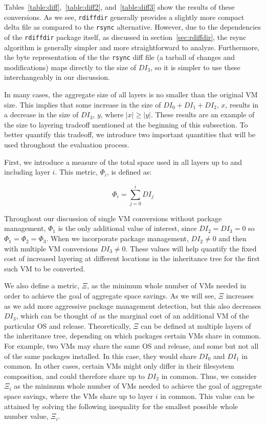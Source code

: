 Tables~\ref{table:diff},~\ref{table:diff2}, and~\ref{table:diff3} show the results of these conversions. As we see, \texttt{rdiffdir} generally provides a slightly more compact delta file as compared to the \texttt{rsync} alternative. However, due to the dependencies of the \texttt{rdiffdir} package itself, as discussed in section~\ref{sec:rdiffdir}, the rsync algorithm is generally simpler and more straightforward to analyze. Furthermore, the byte representation of the the \texttt{rsync} diff file (a tarball of changes and modifications) maps directly to the size of $DI_3$, so it is simpler to use these interchangeably in our discussion.

In many cases, the aggregate size of all layers is no smaller than the original VM size. This implies that some increase in the size of $DI_0+DI_1 + DI_2$, $x$, results in a decrease in the size of $DI_3$, $y$, where $|x| \ge |y|$. These results are an example of the size to layering tradeoff mentioned at the beginning of this subsection. To better quantify this tradeoff, we introduce two important quantities that will be used throughout the evaluation process. 

First, we introduce a measure of the total space used in all layers up to and including layer $i$. This metric, $\Phi_i$, is defined as:

\begin{equation}
\Phi_i = \sum_{j=0}^i DI_j
\end{equation}

Throughout our discussion of single VM conversions without package management, $\Phi_1$ is the only additional value of interest, since $DI_2=DI_3=0$ so $\Phi_1=\Phi_2=\Phi_3$. When we incorporate package management, $DI_2 \neq 0$ and then with multiple VM conversions $DI_3 \neq 0$. These values will help quantify the fixed cost of increased layering at different locations in the inheritance tree for the first such VM to be converted. 

We also define a metric, $\Xi$, as the minimum whole number of VMs needed in order to achieve the goal of aggregate space savings. As we will see, $\Xi$ increases as we add more aggressive package management detection, but this also decreases $DI_3$, which can be thought of as the marginal cost of an additional VM of the particular OS and release. Theoretically, $\Xi$ can be defined at multiple layers of the inheritance tree, depending on which packages certain VMs share in common. For example, two VMs may share the same OS and release, and some but not all of the same packages installed. In this case, they would share $DI_0$ and $DI_1$ in common. In other cases, certain VMs might only differ in their filesystem composition, and could therefore share up to $DI_2$ in common. Thus, we consider $\Xi_i$ as the minimum whole number of VMs needed to achieve the goal of aggregate space savings, where the VMs share up to layer $i$ in common. This value can be attained by solving the following inequality for the smallest possible whole number value, $\Xi_i$.

